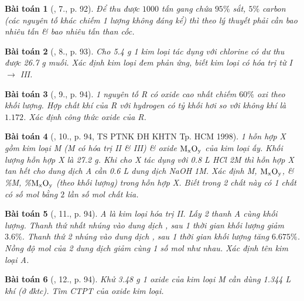 \documentclass{article}
\newtheorem{baitoan}{Bài toán}
\begin{document}
\begin{baitoan}[\cite{An_Hoa_Hoc_nang_cao_8_9}, 7., p. 92]
	Để thu được $1000$ tấn gang chứa $95\%$ sắt, $5\%$ carbon (các nguyên tố khác chiếm 1 lượng không đáng kể) thì theo lý thuyết phải cần bao nhiêu tấn {\rm{}} \& bao nhiêu tấn than cốc. 
\end{baitoan}

\begin{baitoan}[\cite{An_Hoa_Hoc_nang_cao_8_9}, 8., p. 93]
	Cho {\rm5.4 g} 1 kim loại tác dụng với chlorine có dư thu được {\rm26.7  g} muối. Xác định kim loại đem phản ứng, biết kim loại có hóa trị từ I $\to$ III.
\end{baitoan}

\begin{baitoan}[\cite{An_Hoa_Hoc_nang_cao_8_9}, 9., p. 94]
	1 nguyên tố R có oxide cao nhất chiếm $60\%$ oxi theo khối lượng. Hợp chất khí của R với hydrogen có tỷ khối hơi so với không khí là $1.172$. Xác định công thức oxide của R.
\end{baitoan}

\begin{baitoan}[\cite{An_Hoa_Hoc_nang_cao_8_9}, 10., p. 94, TS PTNK ĐH KHTN Tp. HCM 1998]
	1 hỗn hợp X gồm kim loại {\rm M} ({\rm M} có hóa trị II \& III) \& oxide $\rm M_xO_y$ của kim loại ấy. Khối lượng hỗn hợp X là {\rm27.2 g}. Khi cho X tác dụng với {\rm0.8 L HCl 2M} thì hỗn hợp X tan hết cho dung dịch A cần {\rm0.6 L} dung dịch {\rm NaOH 1M}. Xác định {\rm M}, $\rm M_xO_y$, \& {\rm\%M, \%$\rm M_xO_y$} (theo khối lượng) trong hỗn hợp X. Biết trong 2 chất này có 1 chất có số mol bằng $2$ lần số mol chất kia.
\end{baitoan}

\begin{baitoan}[\cite{An_Hoa_Hoc_nang_cao_8_9}, 11., p. 94]
	A là kim loại hóa trị II. Lấy 2 thanh A cùng khối lượng. Thanh thứ nhất nhúng vào dung dịch {\rm{}}, sau 1 thời gian khối lượng giảm $3.6\%$. Thanh thứ 2 nhúng vào dung dịch {\rm{}}, sau 1 thời gian khối lượng tăng $6.675\%$. Nồng độ mol của 2 dung dịch {\rm{}} giảm cùng 1 số mol như nhau. Xác định tên kim loại A.
\end{baitoan}

\begin{baitoan}[\cite{An_Hoa_Hoc_nang_cao_8_9}, 12., p. 94]
	Khử {\rm3.48 g} 1 oxide của kim loại M cần dùng {\rm1.344 L} khí {\rm{}} (ở đktc). Tìm {\rm CTPT} của oxide kim loại.
\end{baitoan}
\end{document}

